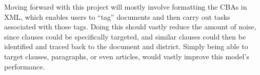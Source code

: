 Moving forward with this project will mostly involve formatting the CBAs in XML, which enables users to “tag” documents and then carry out tasks associated with those tags. Doing this should vastly reduce the amount of noise, since clauses could be specifically targeted, and similar clauses could then be identified and traced back to the document and district. Simply being able to target clauses, paragraphs, or even articles, would vastly improve this model’s performance.

